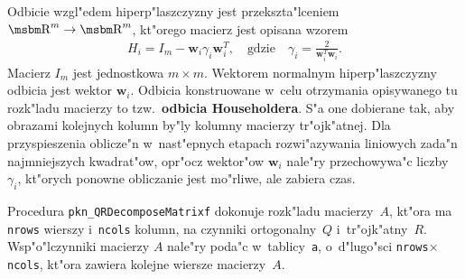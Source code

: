 Odbicie wzgl"edem hiperp"laszczyzny jest przekszta"lceniem
$\R^m\rightarrow\R^m$, kt"orego macierz jest opisana wzorem
\begin{align*}
H_i = I_m-\bm{w}_i\gamma_i\bm{w}_i^T,
\quad\mbox{gdzie}\quad
  \gamma_i = \frac{2}{\bm{w}_i^T\bm{w}_i}.
\end{align*}
Macierz $I_m$ jest jednostkowa $m\times m$. Wektorem normalnym
hiperp"laszczyzny odbicia jest wektor $\bm{w}_i$. Odbicia konstruowane
w~celu otrzymania opisywanego tu rozk"ladu macierzy to tzw.\ \textbf{odbicia
Householdera}. S"a one dobierane tak, aby obrazami kolejnych kolumn by"ly
kolumny macierzy tr"ojk"atnej. Dla przyspieszenia oblicze"n w~nast"epnych
etapach rozwi"azywania liniowych zada"n najmniejszych kwadrat"ow, opr"ocz
wektor"ow $\bm{w}_i$ nale"ry przechowywa"c liczby $\gamma_i$, kt"orych
ponowne obliczanie jest mo"rliwe, ale zabiera czas.

\vspace{\bigskipamount}
Procedura \texttt{pkn\_QRDecomposeMatrixf} dokonuje rozk"ladu macierzy~$A$,
kt"ora ma \texttt{nrows} wierszy i~\texttt{ncols} kolumn, na czynniki
ortogonalny~$Q$ i~tr"ojk"atny~$R$. Wsp"o"lczynniki macierzy $A$ nale"ry
poda"c w~tablicy~\texttt{a}, o~d"lugo"sci
\texttt{nrows}$\times$\texttt{ncols}, kt"ora zawiera kolejne wiersze
macierzy~$A$.


